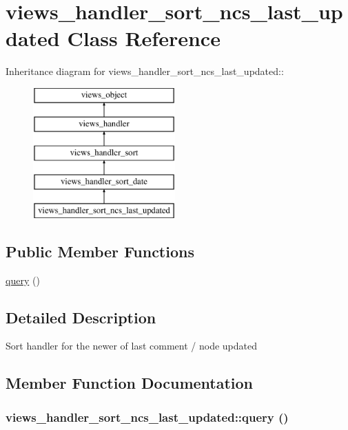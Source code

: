 \hypertarget{classviews__handler__sort__ncs__last__updated}{
\section{views\_\-handler\_\-sort\_\-ncs\_\-last\_\-updated Class Reference}
\label{classviews__handler__sort__ncs__last__updated}
}
Inheritance diagram for views\_\-handler\_\-sort\_\-ncs\_\-last\_\-updated::\begin{figure}[H]
\begin{center}
\leavevmode
\includegraphics[height=5cm]{classviews__handler__sort__ncs__last__updated}
\end{center}
\end{figure}
\subsection*{Public Member Functions}
\begin{CompactItemize}
\item 
\hyperlink{classviews__handler__sort__ncs__last__updated_05d2ef9eb8727ee81915b34254d99355}{query} ()
\end{CompactItemize}


\subsection{Detailed Description}
Sort handler for the newer of last comment / node updated 

\subsection{Member Function Documentation}
\hypertarget{classviews__handler__sort__ncs__last__updated_05d2ef9eb8727ee81915b34254d99355}{
\subsubsection[{query}]{\setlength{\rightskip}{0pt plus 5cm}views\_\-handler\_\-sort\_\-ncs\_\-last\_\-updated::query ()}}
\label{classviews__handler__sort__ncs__last__updated_05d2ef9eb8727ee81915b34254d99355}


